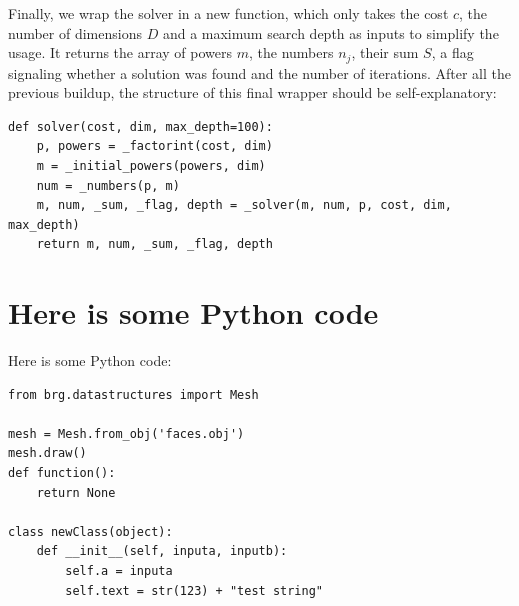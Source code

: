 \documentclass[english, parskip=full]{scrartcl}
\begin{document}
Finally, we wrap the solver in a new function, which only takes the cost $c$, the number of dimensions $D$ and a maximum search depth as inputs to simplify the usage. It returns the array of powers $m$, the numbers $n_j$, their sum $S$, a flag signaling whether a solution was found and the number of iterations. After all the previous buildup, the structure of this final wrapper should be self-explanatory:
\begin{verbatim}
def solver(cost, dim, max_depth=100):
    p, powers = _factorint(cost, dim)
    m = _initial_powers(powers, dim)
    num = _numbers(p, m)
    m, num, _sum, _flag, depth = _solver(m, num, p, cost, dim, max_depth)        
    return m, num, _sum, _flag, depth
\end{verbatim}


\newpage
\appendix
\section{Here is some Python code}
Here is some Python code: 
\begin{verbatim}
from brg.datastructures import Mesh
 
mesh = Mesh.from_obj('faces.obj')
mesh.draw()
def function():
    return None
    
class newClass(object):
    def __init__(self, inputa, inputb):
        self.a = inputa
        self.text = str(123) + "test string" 
\end{verbatim}
\end{document}
